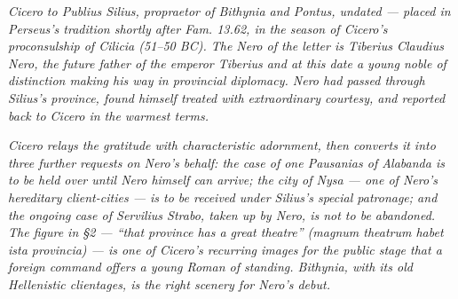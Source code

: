 
\textit{Cicero to Publius Silius, propraetor of Bithynia and
Pontus, undated --- placed in Perseus's tradition shortly
after \textit{Fam.} 13.62, in the season of Cicero's
proconsulship of Cilicia (51--50 BC). The Nero of the
letter is Tiberius Claudius Nero, the future father of the
emperor Tiberius and at this date a young noble of
distinction making his way in provincial diplomacy.
Nero had passed through Silius's province, found himself
treated with extraordinary courtesy, and reported back to
Cicero in the warmest terms.}

\textit{Cicero relays the gratitude with characteristic
adornment, then converts it into three further requests on
Nero's behalf: the case of one Pausanias of Alabanda is to
be held over until Nero himself can arrive; the city of
Nysa --- one of Nero's hereditary client-cities --- is to
be received under Silius's special patronage; and the
ongoing case of Servilius Strabo, taken up by Nero, is not
to be abandoned. The figure in §2 --- ``that province has
a great theatre'' (\textit{magnum theatrum habet ista
provincia}) --- is one of Cicero's recurring images for
the public stage that a foreign command offers a young
Roman of standing. Bithynia, with its old Hellenistic
clientages, is the right scenery for Nero's debut.}
